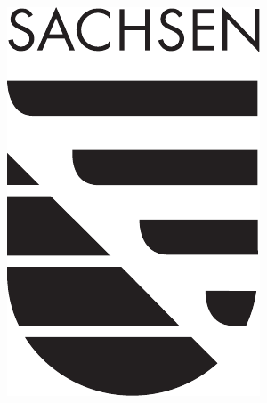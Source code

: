 \documentclass[sw]{iosart2x}
\begin{document}
\begin{ack}
\begin{minipage}{0.90\textwidth}
\end{minipage}%
\hfill%
\begin{minipage}{0.04\textwidth}\raggedleft
\includegraphics[width=\textwidth]{img/saxony.pdf}
\end{minipage}
\end{ack}



\end{document}
